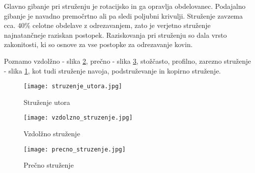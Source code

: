 Glavno gibanje pri struženju je rotacijsko in ga opravlja 
obdelovanec. Podajalno gibanje je navadno premočrtno ali pa 
sledi poljubni krivulji. Struženje zavzema cca. 40\% celotne 
obdelave z odrezavanjem, zato je verjetno struženje najnatančneje
raziskan postopek. Raziskovanja pri struženju so dala vrsto 
zakonitosti, ki so osnove za vse postopke za odrezavanje kovin. 

Poznamo vzdolžno - slika \ref{vzdolzno_struzenje}, 
prečno - slika \ref{precno_struzenje}, stožčasto, profilno,
zarezno struženje - slika \ref{struzenje_utora}, kot tudi struženje navoja, podstruževanje in kopirno struženje.

\begin{multicols}{3}
    \begin{figure}[H]
        \texttt{[image: struzenje\_utora.jpg]}
        \caption{Struženje utora
        \cite{sts_arhiv_struzenje}}
        \label{struzenje_utora}
    \end{figure}

    \columnbreak

    \begin{figure}[H]
        \texttt{[image: vzdolzno\_struzenje.jpg]}
        \caption{Vzdolžno struženje
        \cite{sts_arhiv_struzenje}}
        \label{vzdolzno_struzenje}
    \end{figure}

    \columnbreak

    \begin{figure}[H]
        \texttt{[image: precno\_struzenje.jpg]}
        \caption{Prečno struženje
        \cite{sts_arhiv_struzenje}}
        \label{precno_struzenje}
    \end{figure}
\end{multicols}

\newpage
